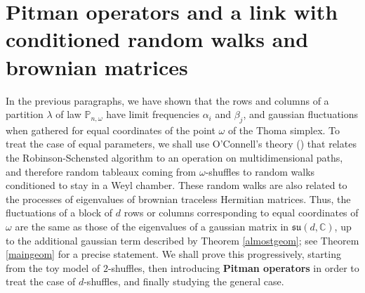 \documentclass[smallextended,nospthms]{svjour3}
\theoremstyle{remark}
\newcommand{\C}{\mathbb{C}}
\newcommand{\proba}{\mathbb{P}}
\begin{document}
\section{Pitman operators and a link with conditioned random walks and brownian matrices}\label{oconnell}
In the previous paragraphs, we have shown that the rows and columns of a partition $\lambda$ of law $\proba_{n,\omega}$ have limit frequencies $\alpha_{i}$ and $\beta_{j}$, and gaussian fluctuations when gathered  for equal coordinates of the point $\omega$ of the Thoma simplex. To treat the case of equal parameters, we shall use O'Connell's theory (\cite{OC03}) that relates the Robinson-Schensted algorithm to an operation on multidimensional paths, and therefore random tableaux coming from $\omega$-shuffles to random walks conditioned to stay in a Weyl chamber. These random walks are also related to the processes of eigenvalues of brownian traceless Hermitian matrices. Thus, the fluctuations of a block of $d$ rows or columns corresponding to equal coordinates of $\omega$ are the same as those of the eigenvalues of a gaussian matrix in $\mathfrak{su}(d,\C)$, up to the additional gaussian term described by Theorem \ref{almostgeom}; see Theorem \ref{maingeom} for a precise statement. We shall prove this progressively, starting from the toy model of $2$-shuffles, then introducing \textbf{Pitman operators} in order to treat the case of $d$-shuffles, and finally studying the general case.
\end{document}
